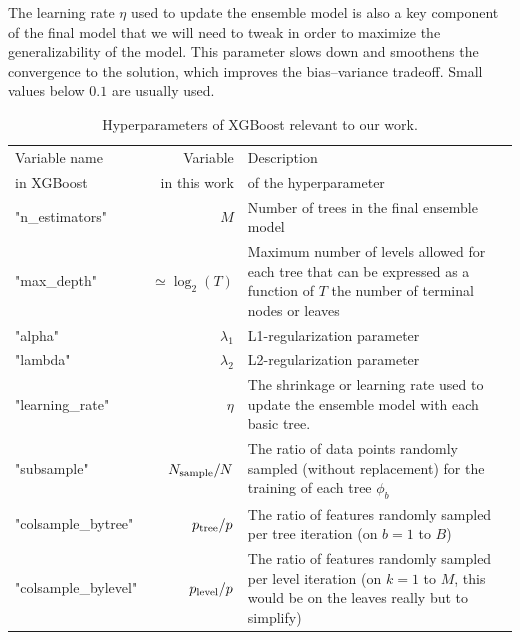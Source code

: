 \documentclass[main]{subfiles}
\begin{document}
The learning rate $\eta$ used to update the ensemble model is also a key component of the final model that we will need to tweak in order to maximize the generalizability of the model. This parameter slows down and smoothens the convergence to the solution, which improves the bias--variance tradeoff. Small values below $0.1$ are usually used.

\begin{table}[ht]
  \centering
  \begin{tabular}{|l|r|m{8cm}|}
  \hline
    Variable name  &  Variable   &   Description\\
    in XGBoost  &    in this work &  of the hyperparameter \\
  \hline
      "n\_estimators" &   $M$ &   Number of trees in the final ensemble model  \\
      "max\_depth" &      $\simeq\log_2(T)$ &   Maximum number of levels allowed for each tree that can be expressed as a function of $T$ the number of terminal nodes or leaves \\
      "alpha" &   $\lambda_1$ &   L1-regularization parameter  \\
      "lambda" &   $\lambda_2$ &  L2-regularization parameter  \\
      "learning\_rate" &   $\eta$ &   The shrinkage or learning rate used to update the ensemble model with each basic tree.  \\
      "subsample" &   $N_{\text{sample}}/N$ &   The ratio of data points randomly sampled (without replacement) for the training of each tree $\phi_b$  \\
      "colsample\_bytree" &   $p_{\text{tree}}/p$  &   The ratio of features randomly sampled per tree iteration (on $b=1$ to $B$)  \\
      "colsample\_bylevel" &   $p_{\text{level}}/p$  &   The ratio of features randomly sampled per level iteration (on $k=1$ to $M$, this would be on the leaves really but to simplify) \\
  \hline
  \end{tabular}
  \caption{Hyperparameters of XGBoost relevant to our work.}\label{tab:hyperparameter}
\end{table}
\end{document}

